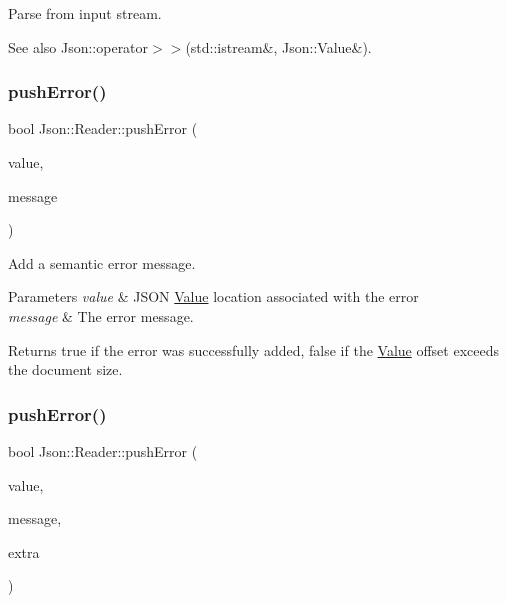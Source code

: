 Parse from input stream. 

\begin{DoxySeeAlso}{See also}
Json\+::operator$>$$>$(std\+::istream\&, Json\+::\+Value\&). 
\end{DoxySeeAlso}
\hypertarget{class_json_1_1_reader_af5fa7099083f01706635ade1d0f8ddb5}{}\label{class_json_1_1_reader_af5fa7099083f01706635ade1d0f8ddb5} 
\subsubsection{\texorpdfstring{push\+Error()}{pushError()}\hspace{0.1cm}{\footnotesize\ttfamily [1/4]}}
{\footnotesize\ttfamily bool Json\+::\+Reader\+::push\+Error (\begin{DoxyParamCaption}\item[{const \hyperlink{class_json_1_1_value}{Value} \&}]{value,  }\item[{const \hyperlink{config_8h_a1e723f95759de062585bc4a8fd3fa4be}{J\+S\+O\+N\+C\+P\+P\+\_\+\+S\+T\+R\+I\+NG} \&}]{message }\end{DoxyParamCaption})}



Add a semantic error message. 


\begin{DoxyParams}{Parameters}
{\em value} & J\+S\+ON \hyperlink{class_json_1_1_value}{Value} location associated with the error \\
\hline
{\em message} & The error message. \\
\hline
\end{DoxyParams}
\begin{DoxyReturn}{Returns}
{\ttfamily true} if the error was successfully added, {\ttfamily false} if the \hyperlink{class_json_1_1_value}{Value} offset exceeds the document size. 
\end{DoxyReturn}
\hypertarget{class_json_1_1_reader_a3568be9db568ff57bd3fcc373143dff3}{}\label{class_json_1_1_reader_a3568be9db568ff57bd3fcc373143dff3} 
\subsubsection{\texorpdfstring{push\+Error()}{pushError()}\hspace{0.1cm}{\footnotesize\ttfamily [2/4]}}
{\footnotesize\ttfamily bool Json\+::\+Reader\+::push\+Error (\begin{DoxyParamCaption}\item[{const \hyperlink{class_json_1_1_value}{Value} \&}]{value,  }\item[{const \hyperlink{config_8h_a1e723f95759de062585bc4a8fd3fa4be}{J\+S\+O\+N\+C\+P\+P\+\_\+\+S\+T\+R\+I\+NG} \&}]{message,  }\item[{const \hyperlink{class_json_1_1_value}{Value} \&}]{extra }\end{DoxyParamCaption})}



